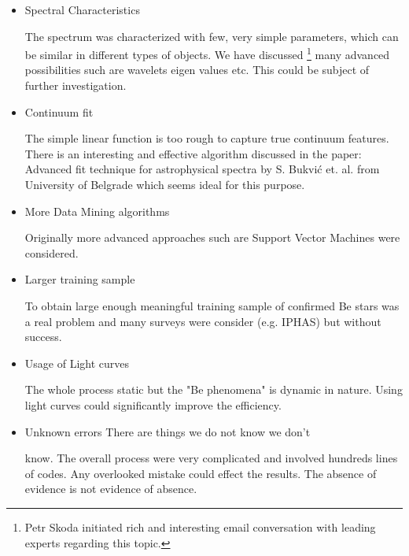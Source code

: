 \begin{itemize}
\item Spectral Characteristics 

  The spectrum was characterized with few, very simple parameters,
  which can be similar in different types of objects. We have
  discussed \footnote{Petr Skoda initiated rich and interesting email
    conversation with leading experts regarding this topic.} many
  advanced possibilities such are wavelets eigen values etc. This
  could be subject of further investigation.
\item Continuum fit

  The simple linear function is too rough to capture true continuum
  features. There is an interesting and effective algorithm discussed
  in the paper: Advanced fit technique for astrophysical spectra by
  S. Bukvi{\'c} et. al. from University of Belgrade
  \citep{bukvic2008advanced} which seems ideal for this purpose.

\item More Data Mining algorithms

Originally more advanced approaches such are Support Vector Machines
were considered.
\item Larger training sample

  To obtain large enough meaningful training sample of confirmed Be
  stars was a real problem and  many surveys were consider
  (e.g. IPHAS)  but without success.

\item Usage of Light curves 

  The whole process static but the "Be phenomena" is dynamic in
  nature. Using light curves could significantly improve the
  efficiency.
\item Unknown errors There are things we do not know we don't

  know. The overall process were very complicated and involved
  hundreds lines of codes. Any overlooked mistake could effect the
  results. The absence of evidence is not evidence of absence.
\end{itemize}



